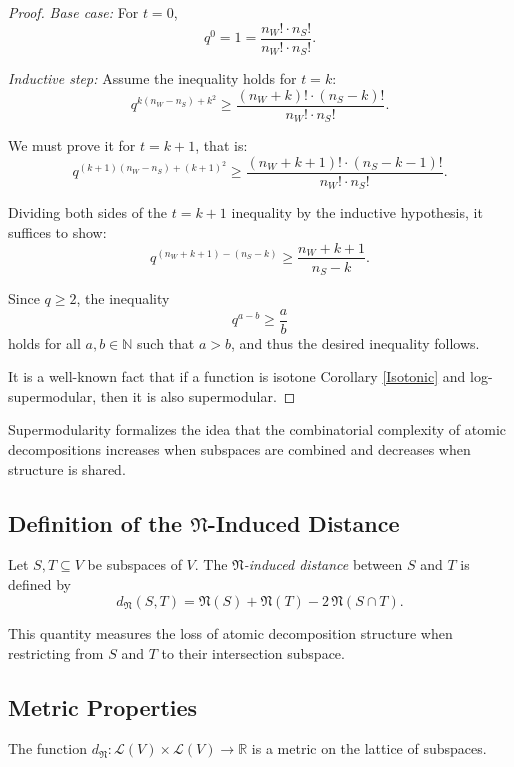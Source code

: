 \documentclass{svproc}
\begin{document}
\begin{proof}
		\emph{Base case:} For \( t = 0 \),
		\[
		q^0 = 1 = \frac{n_W! \cdot n_S!}{n_W! \cdot n_S!}.
		\]
		
		\emph{Inductive step:} Assume the inequality holds for \( t = k \):
		\[
		q^{k(n_W - n_S) + k^2} \geq \frac{(n_W + k)! \cdot (n_S - k)!}{n_W! \cdot n_S!}.
		\]
		
		We must prove it for \( t = k + 1 \), that is:
		\[
		q^{(k+1)(n_W - n_S) + (k+1)^2} \geq \frac{(n_W + k + 1)! \cdot (n_S - k - 1)!}{n_W! \cdot n_S!}.
		\]
		
		Dividing both sides of the \( t = k+1 \) inequality by the inductive hypothesis, it suffices to show:
		\[
		q^{(n_W + k + 1) - (n_S - k)} \geq \frac{n_W + k + 1}{n_S - k}.
		\]
		
		Since \( q \geq 2 \), the inequality
		\[
		q^{a-b} \geq \frac{a}{b}
		\]
		holds for all \( a,b \in \mathbb{N} \) such that $a>b$, and thus the desired inequality follows. 

        \item[(ii)] It is a well-known fact that if a function is isotone Corollary \ref{Isotonic} and log-supermodular, then it is also supermodular.
\end{proof}

Supermodularity formalizes the idea that the combinatorial complexity of
atomic decompositions increases when subspaces are combined and decreases
when structure is shared.

\subsection{Definition of the $\mathfrak N$-Induced Distance}

\begin{definition}
Let $S,T \subseteq V$ be subspaces of $V$.
The \emph{$\mathfrak N$-induced distance} between $S$ and $T$ is defined by
\[
d_{\mathfrak N}(S,T)
=
\mathfrak N(S) + \mathfrak N(T) - 2\,\mathfrak N(S \cap T).
\]
\end{definition}

This quantity measures the loss of atomic decomposition structure when
restricting from $S$ and $T$ to their intersection subspace.

\subsection{Metric Properties}

\begin{theorem}
The function $d_{\mathfrak N} : \mathcal L(V) \times \mathcal L(V) \to \mathbb R$
is a metric on the lattice of subspaces.
\end{theorem}
\end{document}
